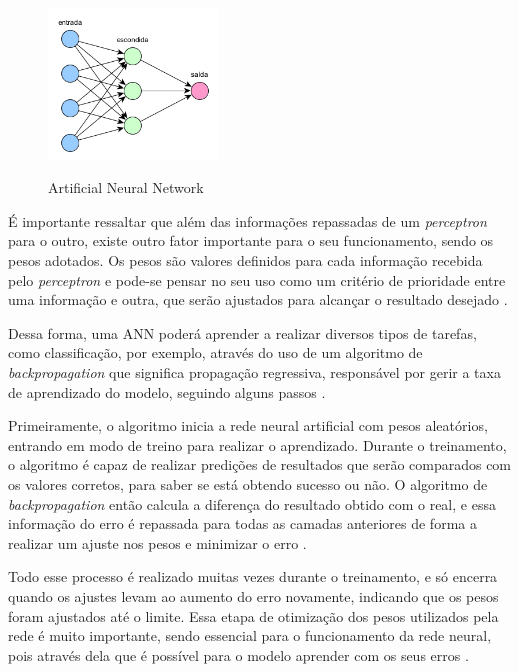 \begin{figure}[!htb]
	\centering
	\caption{Artificial Neural Network}
	\includegraphics[width=0.40\textwidth]{img/neuralNetwork.png}
	\label{fig:neuralNetwork}
\end{figure}

É importante ressaltar que além das informações repassadas de um \emph{perceptron} para o outro, existe outro fator importante para o seu funcionamento, sendo os pesos adotados. Os pesos são valores definidos para cada informação recebida pelo \emph{perceptron} e pode-se pensar no seu uso como um critério de prioridade entre uma informação e outra, que serão ajustados para alcançar o resultado desejado \cite{deepLearningTensorFlow}.

Dessa forma, uma ANN poderá aprender a realizar diversos tipos de tarefas, como classificação, por exemplo, através do uso de um algoritmo de \emph{backpropagation} que significa propagação regressiva, responsável por gerir a taxa de aprendizado do modelo, seguindo alguns passos \cite{deepLearningTensorFlow}.

Primeiramente, o algoritmo inicia a rede neural artificial com pesos aleatórios, entrando em modo de treino para realizar o aprendizado. Durante o treinamento, o algoritmo é capaz de realizar predições de resultados que serão comparados com os valores corretos, para saber se está obtendo sucesso ou não. O algoritmo de \emph{backpropagation} então calcula a diferença do resultado obtido com o real, e essa informação do erro é repassada para todas as camadas anteriores de forma a realizar um ajuste nos pesos e minimizar o erro \cite{deepLearningTensorFlow}.

Todo esse processo é realizado muitas vezes durante o treinamento, e só encerra quando os ajustes levam ao aumento do erro novamente, indicando que os pesos foram ajustados até o limite. Essa etapa de otimização dos pesos utilizados pela rede é muito importante, sendo essencial para o funcionamento da rede neural, pois através dela que é possível para o modelo aprender com os seus erros \cite{deepLearningTensorFlow}.

